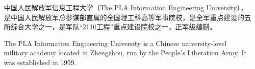 \begin{cabstract}
中国人民解放军信息工程大学（The PLA Information Engineering University），是中国人民解放军总参谋部直属的全国理工科高等军事院校，是全军重点建设的五所综合大学之一，是军队“2110工程”重点建设院校之一，正军级编制。
\end{cabstract}

\begin{eabstract}
The PLA Information Engineering University is a Chinese university-level military academy located in Zhengzhou, run by the People's Liberation Army. It was established in 1999.

\end{eabstract}

